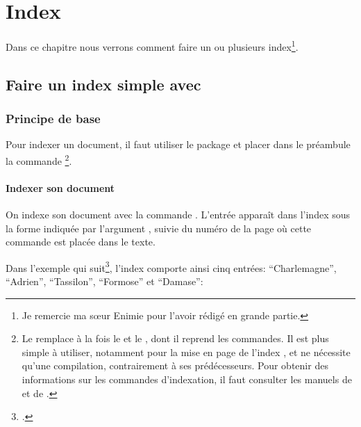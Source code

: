 \chapter{Index}

\begin{intro}

Dans ce chapitre nous verrons comment faire un ou plusieurs index\footnote{Je remercie ma sœur Enimie pour l'avoir rédigé en grande partie.}.

\end{intro}


\section{Faire un index simple avec }


\subsection{Principe de base}


Pour indexer un document, il faut utiliser le package  et placer  dans le préambule la commande \footnote{Le  remplace à la fois le   et le  , dont il reprend les commandes. Il est plus simple à utiliser, notamment pour la mise en page de l'index , et ne nécessite qu'une compilation, contrairement à ses prédécesseurs. Pour obtenir des informations sur les commandes d'indexation, il faut consulter les manuels de  et de .}.

\begin{latexcode}
\usepackage{indextools}
\makeindex
\end{latexcode}

\subsubsection{Indexer son document}



On indexe son document avec  la commande \label{cmdindex}. L'entrée apparaît dans l'index sous la forme indiquée par l'argument , suivie du numéro de la page où cette commande est placée dans le texte. 

Dans l'exemple qui suit\footcite{eginhard}, l'index comporte ainsi cinq entrées: \enquote{Charlemagne}, \enquote{Adrien}, \enquote{Tassilon}, \enquote{Formose} et \enquote{Damase}:

